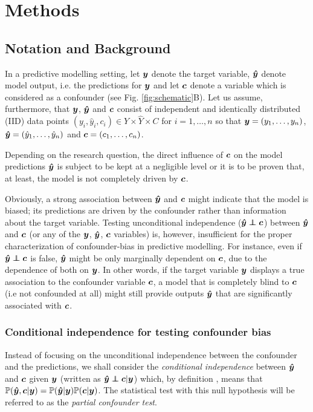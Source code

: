 \documentclass{article}
\begin{document}
\section{Methods}

\subsection{Notation and Background}

In a predictive modelling setting, let $\boldsymbol{y}$ denote the target variable, $\boldsymbol{\hat{y}}$ denote model output, i.e. the predictions for $\boldsymbol{y}$ and let $\boldsymbol{c}$ denote a variable which is considered as a confounder (see Fig. \ref{fig:schematic}B). Let us assume, furthermore, that $\boldsymbol{y}$, $\boldsymbol{\hat{y}}$ and $\boldsymbol{c}$ consist of independent and identically distributed (IID) data points $(y_i, \hat{y}_i, c_i) \in Y \times \hat{Y} \times C$ for $i=1, \dots , n$ so that $\boldsymbol{y}=(y_1, \dots ,y_n)$, $\boldsymbol{\hat{y}}=(\hat{y}_1, \dots, \hat{y}_n)$ and $\boldsymbol{c}=(c_1, \dots, c_n)$. 

Depending on the research question, the direct influence of $\boldsymbol{c}$ on the model predictions $\boldsymbol{\hat{y}}$ is subject to be kept at a negligible level or it is to be proven that, at least, the model is not completely driven by $\boldsymbol{c}$.

Obviously, a strong association between $\boldsymbol{\hat{y}}$ and $\boldsymbol{c}$ might indicate that the model is biased; its predictions are driven by the confounder rather than information about the target variable.
Testing unconditional independence ($\yhat \independent \c$) between $\boldsymbol{\hat{y}}$ and $\boldsymbol{c}$ (or any of the $\boldsymbol{y}$, $\boldsymbol{\hat{y}}$, $\boldsymbol{c}$ variables) is, however, insufficient for the proper characterization of confounder-bias in predictive modelling.
For instance, even if $\yhat \independent \c$ is false, $\boldsymbol{\hat{y}}$ might be only marginally dependent on $\boldsymbol{c}$, due to the dependence of both on $\boldsymbol{y}$. In other words, if the target variable $\boldsymbol{y}$ displays a true association to the confounder variable $\boldsymbol{c}$, a model that is completely blind to $\boldsymbol{c}$ (i.e not confounded at all) might still provide outputs $\boldsymbol{\hat{y}}$ that are significantly associated with $\boldsymbol{c}$.

\subsubsection*{Conditional independence for testing confounder bias}

Instead of focusing on the unconditional independence between the confounder and the predictions, we shall consider the \emph{conditional independence} between $\boldsymbol{\hat{y}}$ and $\boldsymbol{c}$ given $\boldsymbol{y}$ (written as $\yhat \independent \c | \y$) which, by definition  \citep{dawid1979conditional}, means that $\mathbb{P}(\boldsymbol{\hat{y}}, \boldsymbol{c}|\boldsymbol{y}) = \mathbb{P}(\boldsymbol{\hat{y}}|\boldsymbol{y})\mathbb{P}(\boldsymbol{c}|\boldsymbol{y})$. The statistical test with this null hypothesis will be referred to as the \emph{partial confounder test}.
\end{document}

